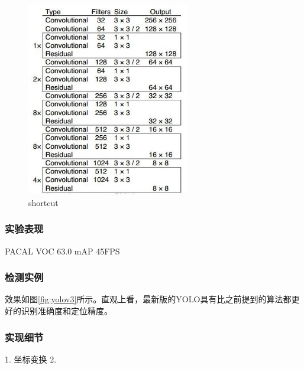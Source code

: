 \documentclass[12pt,a4paper,titlepage]{article}
\begin{document}
\begin{figure}[h]
\centering
\includegraphics[height=8.5cm]{img/darknet53.jpg}
\caption{shortcut}
\label{fig:darknet53}
\end{figure}


\subsubsection{实验表现}
PACAL VOC 63.0 mAP    45FPS
\subsubsection{检测实例}
效果如图\ref{fig:yolov3}所示。直观上看，最新版的YOLO具有比之前提到的算法都更好的识别准确度和定位精度。

\subsubsection{实现细节}
1. 坐标变换
2. 
\end{document}
